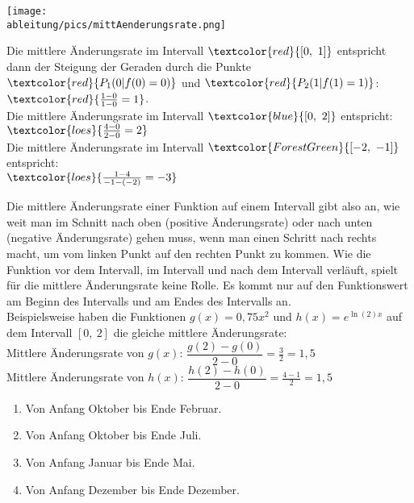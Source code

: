 \begin{minipage}{\textwidth}
	\begin{minipage}{0.49\textwidth}
		\centering\texttt{[image: \\ableitung/pics/mittAenderungsrate.png]}
	\end{minipage}
	\begin{minipage}{0.49\textwidth}
		Die mittlere Änderungsrate im Intervall \(\textcolor{red}{[0,\ 1]}\) entspricht dann der Steigung der Geraden durch die Punkte \(\textcolor{red}{P_1(0\vert f(0)=0)}\) und \(\textcolor{red}{P_2(1\vert f(1)=1)}\): \(\textcolor{red}{\frac{1-0}{1-0}=1}\).\\
		Die mittlere Änderungsrate im Intervall \(\textcolor{blue}{[0,\ 2]}\) entspricht:\\
		\(\textcolor{loes}{\frac{4-0}{2-0}=2}\)\vspace{0.5cm}\\
		Die mittlere Änderungsrate im Intervall \(\textcolor{ForestGreen}{[-2,\ -1]}\) entspricht:\\
		\(\textcolor{loes}{\frac{1-4}{-1-(-2)}=-3}\)\vspace{1cm}
	\end{minipage}
\end{minipage}\vspace{.5cm}
Die mittlere Änderungsrate einer Funktion auf einem Intervall gibt also an, wie weit man im Schnitt nach oben (positive Änderungsrate) oder nach unten (negative Änderungsrate) gehen muss, wenn man einen Schritt nach rechts macht, um vom linken Punkt auf den rechten Punkt zu kommen. Wie die Funktion vor dem Intervall, im Intervall und nach dem Intervall verläuft, spielt für die mittlere Änderungsrate keine Rolle. Es kommt nur auf den Funktionswert am Beginn des Intervalls und am Endes des Intervalls an.\\
Beispielsweise haben die Funktionen \(g(x)=0,75x^2\) und \(h(x)=e^{\ln(2)x}\) auf dem Intervall \([0,\ 2]\) die gleiche mittlere Änderungsrate:\\
Mittlere Änderungsrate von \(g(x)\): \(\dfrac{g(2)-g(0)}{2-0}=\frac{3}{2}=1,5\)\\
Mittlere Änderungsrate von \(h(x)\): \(\dfrac{h(2)-h(0)}{2-0}=\frac{4-1}{2}=1,5\)
\newpage
\begin{minipage}{\textwidth}
	\begin{Exercise}[title={Bestimme die durchschnittliche Änderungsrate des DAX für folgende Zeiträume jeweils pro Monat.}, label=aenderungsrateA1]
		\begin{enumerate}[label=\alph*)]
			\item Von Anfang Oktober bis Ende Februar.
			\item Von Anfang Oktober bis Ende Juli.
			\item Von Anfang Januar bis Ende Mai.
			\item Von Anfang Dezember bis Ende Dezember.
		\end{enumerate}
	\end{Exercise}
\end{minipage}
